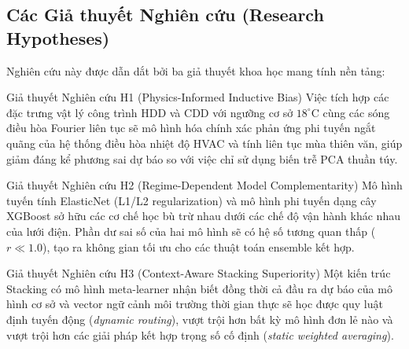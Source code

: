 \subsection{Các Giả thuyết Nghiên cứu (Research Hypotheses)}
Nghiên cứu này được dẫn dắt bởi ba giả thuyết khoa học mang tính nền tảng:

\begin{notebox}{Giả thuyết Nghiên cứu H1 (Physics-Informed Inductive Bias)}
Việc tích hợp các đặc trưng vật lý công trình HDD và CDD với ngưỡng cơ sở $18^\circ\text{C}$ cùng các sóng điều hòa Fourier liên tục sẽ mô hình hóa chính xác phản ứng phi tuyến ngắt quãng của hệ thống điều hòa nhiệt độ HVAC và tính liên tục mùa thiên văn, giúp giảm đáng kể phương sai dự báo so với việc chỉ sử dụng biến trễ PCA thuần túy.
\end{notebox}

\begin{notebox}{Giả thuyết Nghiên cứu H2 (Regime-Dependent Model Complementarity)}
Mô hình tuyến tính ElasticNet (L1/L2 regularization) và mô hình phi tuyến dạng cây XGBoost sở hữu các cơ chế học bù trừ nhau dưới các chế độ vận hành khác nhau của lưới điện. Phần dư sai số của hai mô hình sẽ có hệ số tương quan thấp ($r \ll 1.0$), tạo ra không gian tối ưu cho các thuật toán ensemble kết hợp.
\end{notebox}

\begin{notebox}{Giả thuyết Nghiên cứu H3 (Context-Aware Stacking Superiority)}
Một kiến trúc Stacking có mô hình meta-learner nhận biết đồng thời cả đầu ra dự báo của mô hình cơ sở và vector ngữ cảnh môi trường thời gian thực sẽ học được quy luật định tuyến động (\textit{dynamic routing}), vượt trội hơn bất kỳ mô hình đơn lẻ nào và vượt trội hơn các giải pháp kết hợp trọng số cố định (\textit{static weighted averaging}).
\end{notebox}
